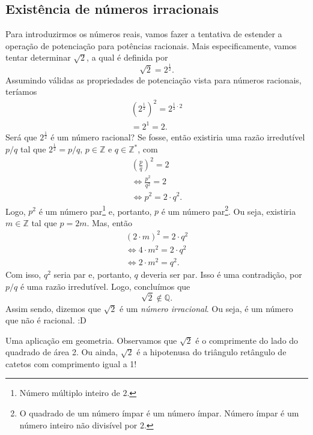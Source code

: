 \subsection{Existência de números irracionais}

Para introduzirmos os números reais, vamos fazer a tentativa de estender a operação de potenciação para potências racionais. Mais especificamente, vamos tentar determinar $\sqrt{2}$, a qual é definida por
\begin{equation}
  \sqrt{2} = 2^{\frac{1}{2}}.
\end{equation}
Assumindo válidas as propriedades de potenciação vista para números racionais, teríamos
\begin{gather}
  \left(2^{\frac{1}{2}}\right)^2 = 2^{\frac{1}{2}\cdot 2} \\
  = 2^1 = 2.
\end{gather}
Será que $2^{\frac{1}{2}}$ é um número racional? Se fosse, então existiria uma razão irredutível $p/q$ tal que $2^{\frac{1}{2}} = p/q$, $p\in\mathbb{Z}$ e $q\in\mathbb{Z}^*$, com
\begin{gather}
  \left(\frac{p}{q}\right)^2 = 2 \\
  \Leftrightarrow \frac{p^2}{q^2} = 2 \\
  \Leftrightarrow p^2 = 2\cdot q^2.
\end{gather}
Logo, $p^2$ é um número par\footnote{Número múltiplo inteiro de $2$.} e, portanto, $p$ é um número par\footnote{O quadrado de um número ímpar é um número ímpar. Número ímpar é um número inteiro não divisível por $2$.}. Ou seja, existiria $m\in\mathbb{Z}$ tal que $p = 2m$. Mas, então
\begin{gather}
  (2\cdot m)^2 = 2\cdot q^2 \\
  \Leftrightarrow 4\cdot m^2 = 2\cdot q^2 \\
  \Leftrightarrow 2\cdot m^2 = q^2.
\end{gather}
Com isso, $q^2$ seria par e, portanto, $q$ deveria ser par. Isso é uma contradição, por $p/q$ é uma razão irredutível. Logo, concluímos que
\begin{equation}
  \sqrt{2}\not\in\mathbb{Q}.
\end{equation}
Assim sendo, dizemos que $\sqrt{2}$ é um \emph{número irracional}. Ou seja, é um número que não é racional. :D

\begin{obs}
  Uma aplicação em geometria. Observamos que $\sqrt{2}$ é o comprimente do lado do quadrado de área 2. Ou ainda, $\sqrt{2}$ é a hipotenusa do triângulo retângulo de catetos com comprimento igual a 1!
\end{obs}

